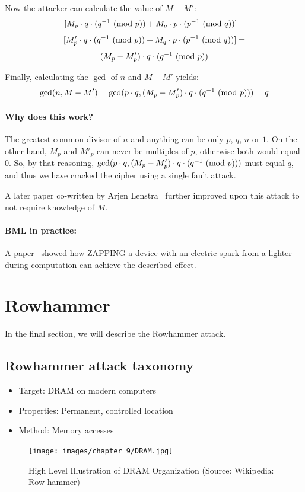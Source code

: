 Now the attacker can calculate the value of \(M - M'\):
\[[M_p \cdot q \cdot (q^{-1} \ (\mathrm{mod}\ p)) + M_q \cdot p \cdot (p^{-1} \ (\mathrm{mod}\ q))]-\]
\[[M'_p \cdot q \cdot (q^{-1} \ (\mathrm{mod}\ p)) + M_q \cdot p \cdot (p^{-1}
\ (\mathrm{mod}\ q))]=\]
\[(M_p - M'_p) \cdot q \cdot (q^{-1} \ (\mathrm{mod}\ p))\]

Finally, calculating the \(\gcd \) of \(n\) and \(M - M'\) yields:
\[\gcd(n, M - M') = \gcd(p \cdot q, (M_p - M'_p) \cdot q \cdot (q^{-1}
\ (\mathrm{mod}\ p))) = q\]

\paragraph{Why does this work?} The greatest common divisor of \(n\) and
anything can be only \(p\), \(q\), \(n\) or \(1\). On the other hand, \(M_p\)
and \(M'_p\) can never be multiples of \(p\), otherwise both would equal 0. So,
by that reasoning, \(\gcd(p \cdot q, (M_p - M'_p) \cdot q \cdot (q^{-1}
\ (\mathrm{mod}\ p)))\) \underline{must} equal \(q\), and thus we have cracked the cipher
using a single fault attack.

A later paper co-written by Arjen Lenstra~\cite{lenstra} further improved upon
this attack to not require knowledge of \(M\).

\paragraph{BML in practice:} A paper~\cite{schmidt} showed how ZAPPING a device
with an electric spark from a lighter during computation can achieve the
described effect.

\section{Rowhammer}\label{sec:rowhammer}
In the final section, we will describe the Rowhammer attack.
\subsection{Rowhammer attack taxonomy}\label{subsec:rowhammer_attack_taxonomy}
	\begin{itemize}
		\item Target: DRAM on modern computers
		\item Properties: Permanent, controlled location
		\item Method: Memory accesses
	\end{itemize}

\begin{figure}[!ht]
	\centering
	\texttt{[image: images/chapter\_9/DRAM.jpg]}
	\caption{High Level Illustration of DRAM Organization (Source: Wikipedia: Row hammer)}\label{fig:dram_svg}
\end{figure}


